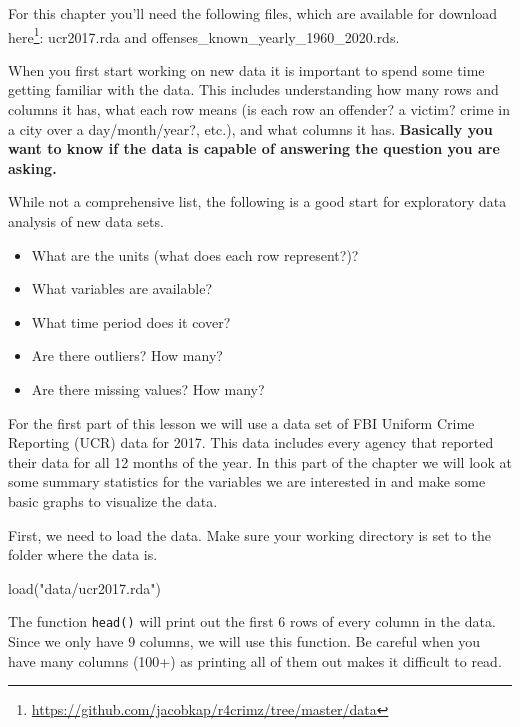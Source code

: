 \documentclass[
  a4paper,
]{krantz}
\makeatletter
\newenvironment{Shaded}{\begin{snugshade}}{\end{snugshade}}
\newcommand{\FunctionTok}[1]{\textcolor[rgb]{0,0,0}{#1}}
\newcommand{\NormalTok}[1]{#1}
\newcommand{\StringTok}[1]{\textcolor[rgb]{0.5,0.5,0.5}{#1}}
\providecommand{\tightlist}{%
  \setlength{\itemsep}{0pt}\setlength{\parskip}{0pt}}
\renewcommand{\href}[2]{#2\footnote{\url{#1}}}
\newenvironment{kframe}{%
\medskip{}
\setlength{\fboxsep}{.8em}
 \def\at@end@of@kframe{}%
 \ifinner\ifhmode%
  \def\at@end@of@kframe{\end{minipage}}%
  \begin{minipage}{\columnwidth}%
 \fi\fi%
 \def\FrameCommand##1{\hskip\@totalleftmargin \hskip-\fboxsep
 \colorbox{shadecolor}{##1}\hskip-\fboxsep
     \hskip-\linewidth \hskip-\@totalleftmargin \hskip\columnwidth}%
 \MakeFramed {\advance\hsize-\width
   \@totalleftmargin\z@ \linewidth\hsize
   \@setminipage}}%
 {\par\unskip\endMakeFramed%
 \at@end@of@kframe}
\renewenvironment{Shaded}{\begin{kframe}}{\end{kframe}}
\makeatother
\begin{document}
For this chapter you'll need the following files, which are
available for download
\href{https://github.com/jacobkap/r4crimz/tree/master/data}{here}:
ucr2017.rda and offenses\_known\_yearly\_1960\_2020.rds.

When you first start working on new data it is important to
spend some time getting familiar with the data. This
includes understanding how many rows and columns it has,
what each row means (is each row an offender? a victim?
crime in a city over a day/month/year?, etc.), and what
columns it has. \textbf{Basically you want to know if the
data is capable of answering the question you are asking.}

While not a comprehensive list, the following is a good
start for exploratory data analysis of new data sets.

\begin{itemize}
\tightlist
\item
  What are the units (what does each row represent?)?
\item
  What variables are available?
\item
  What time period does it cover?
\item
  Are there outliers? How many?
\item
  Are there missing values? How many?
\end{itemize}

For the first part of this lesson we will use a data set of
FBI Uniform Crime Reporting (UCR) data for 2017. This data
includes every agency that reported their data for all 12
months of the year. In this part of the chapter we will look
at some summary statistics for the variables we are
interested in and make some basic graphs to visualize the
data.

First, we need to load the data. Make sure your working
directory is set to the folder where the data is.

\begin{Shaded}
\begin{Highlighting}[]
\FunctionTok{load}\NormalTok{(}\StringTok{"data/ucr2017.rda"}\NormalTok{)}
\end{Highlighting}
\end{Shaded}

The function \texttt{head()} will print out the first 6 rows
of every column in the data. Since we only have 9 columns,
we will use this function. Be careful when you have many
columns (100+) as printing all of them out makes it
difficult to read.
\end{document}
